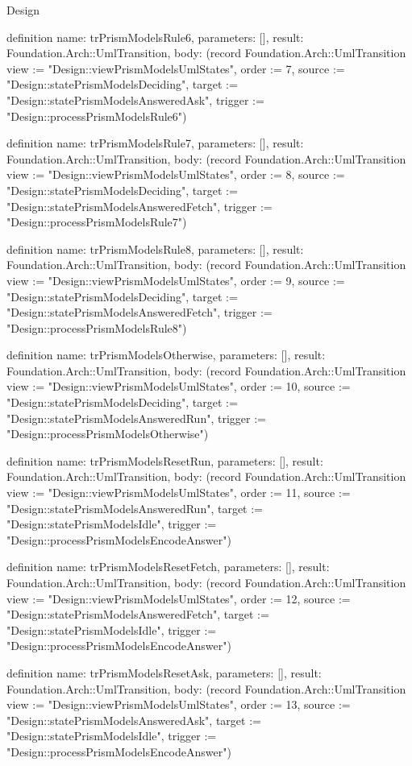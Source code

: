 \begin{lexlean}{Design}
\begin{semanticmodule}
definition{
  name: trPrismModelsRule6,
  parameters: [],
  result: Foundation.Arch::UmlTransition,
  body: (record Foundation.Arch::UmlTransition {view := "Design::viewPrismModelsUmlStates", order := 7, source := "Design::statePrismModelsDeciding", target := "Design::statePrismModelsAnsweredAsk", trigger := "Design::processPrismModelsRule6"})
}

definition{
  name: trPrismModelsRule7,
  parameters: [],
  result: Foundation.Arch::UmlTransition,
  body: (record Foundation.Arch::UmlTransition {view := "Design::viewPrismModelsUmlStates", order := 8, source := "Design::statePrismModelsDeciding", target := "Design::statePrismModelsAnsweredFetch", trigger := "Design::processPrismModelsRule7"})
}

definition{
  name: trPrismModelsRule8,
  parameters: [],
  result: Foundation.Arch::UmlTransition,
  body: (record Foundation.Arch::UmlTransition {view := "Design::viewPrismModelsUmlStates", order := 9, source := "Design::statePrismModelsDeciding", target := "Design::statePrismModelsAnsweredFetch", trigger := "Design::processPrismModelsRule8"})
}

definition{
  name: trPrismModelsOtherwise,
  parameters: [],
  result: Foundation.Arch::UmlTransition,
  body: (record Foundation.Arch::UmlTransition {view := "Design::viewPrismModelsUmlStates", order := 10, source := "Design::statePrismModelsDeciding", target := "Design::statePrismModelsAnsweredRun", trigger := "Design::processPrismModelsOtherwise"})
}

definition{
  name: trPrismModelsResetRun,
  parameters: [],
  result: Foundation.Arch::UmlTransition,
  body: (record Foundation.Arch::UmlTransition {view := "Design::viewPrismModelsUmlStates", order := 11, source := "Design::statePrismModelsAnsweredRun", target := "Design::statePrismModelsIdle", trigger := "Design::processPrismModelsEncodeAnswer"})
}

definition{
  name: trPrismModelsResetFetch,
  parameters: [],
  result: Foundation.Arch::UmlTransition,
  body: (record Foundation.Arch::UmlTransition {view := "Design::viewPrismModelsUmlStates", order := 12, source := "Design::statePrismModelsAnsweredFetch", target := "Design::statePrismModelsIdle", trigger := "Design::processPrismModelsEncodeAnswer"})
}

definition{
  name: trPrismModelsResetAsk,
  parameters: [],
  result: Foundation.Arch::UmlTransition,
  body: (record Foundation.Arch::UmlTransition {view := "Design::viewPrismModelsUmlStates", order := 13, source := "Design::statePrismModelsAnsweredAsk", target := "Design::statePrismModelsIdle", trigger := "Design::processPrismModelsEncodeAnswer"})
}


\end{semanticmodule}
\end{lexlean}

